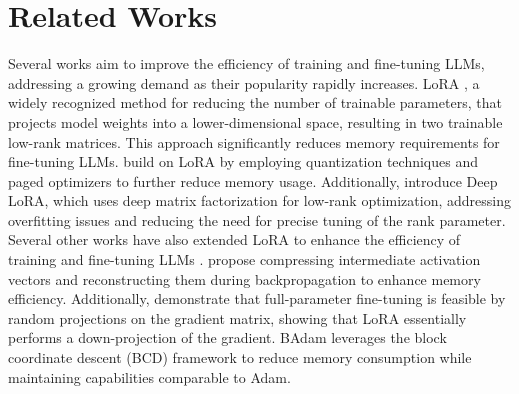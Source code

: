 \section{Related Works}
Several works aim to improve the efficiency of training and fine-tuning LLMs, addressing a growing demand as their popularity rapidly increases. LoRA \citep{hu2021lora}, a widely recognized method for reducing the number of trainable parameters, that projects model weights into a lower-dimensional space, resulting in two trainable low-rank matrices. This approach significantly reduces memory requirements for fine-tuning LLMs.
\citet{dettmers2024qlora} build on LoRA by employing quantization techniques and paged optimizers to further reduce memory usage. Additionally, \citet{yaras2024compressible} introduce Deep LoRA, which uses deep matrix factorization for low-rank optimization, addressing overfitting issues and reducing the need for precise tuning of the rank parameter. Several other works have also extended LoRA to enhance the efficiency of training and fine-tuning LLMs \citep{lialin2023relorahighranktraininglowrank, renduchintala-etal-2024-tied, xia2024chainloraefficientfinetuning, pan2024lisalayerwiseimportancesampling}.
\citet{miles2024veloramemoryefficienttraining} propose compressing intermediate activation vectors and reconstructing them during backpropagation to enhance memory efficiency. Additionally, \citet{hao2024floralowrankadapterssecretly} demonstrate that full-parameter fine-tuning is feasible by random projections on the gradient matrix, showing that LoRA essentially performs a down-projection of the gradient. BAdam \citep{luo2024badammemoryefficientparameter} leverages the block coordinate descent (BCD) framework to reduce memory consumption while maintaining capabilities comparable to Adam.

